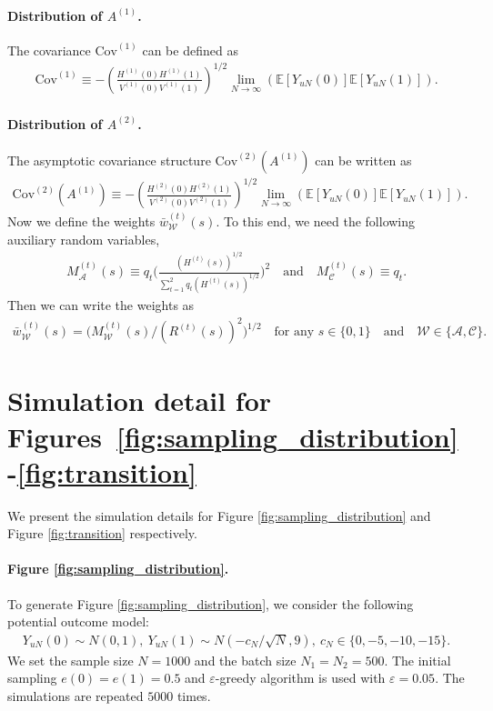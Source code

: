 \documentclass[12pt]{article}
\newcommand{\E}{\mathbb E}								%
\begin{document}
\paragraph{Distribution of $A^{(1)}$.}

The covariance $\mathrm{Cov}^{(1)}$ can be defined as
\begin{align}\label{eq:covariance_A_1}
	\mathrm{Cov}^{(1)}\equiv - \left(\frac{H^{(1)}(0)H^{(1)}(1)}{V^{(1)}(0)V^{(1)}(1)}\right)^{1/2}\lim_{N\rightarrow\infty}\left(\E[Y_{uN}(0)]
	\E[Y_{uN}(1)]\right).
\end{align}


\paragraph{Distribution of $A^{(2)}$.}


The asymptotic covariance structure $\mathrm{Cov}^{(2)}(A^{(1)})$ can be written as
\begin{align}\label{eq:covariance_A_2}
	\mathrm{Cov}^{(2)}(A^{(1)})\equiv - \left(\frac{H^{(2)}(0)H^{(2)}(1)}{V^{(2)}(0)V^{(2)}(1)}\right)^{1/2}\lim_{N\rightarrow\infty}\left(\E[Y_{uN}(0)]
	\E[Y_{uN}(1)]\right).
\end{align}
Now we define the weights $\bar w_{\mathcal{W}}^{(t)}(s)$. To this end, we need the following auxiliary random variables,
\begin{align*}
	M_{\mathcal{A}}^{(t)}(s)\equiv q_t\Big(\frac{(H^{(t)}(s))^{1/2}}{\sum_{t=1}^2 q_t (H^{(t)}(s))^{1/2}}\Big)^2\quad\text{and}\quad M_{\mathcal{C}}^{(t)}(s)\equiv q_t.
\end{align*}
Then we can write the weights as 
\begin{align*}
	\bar w_{\mathcal{W}}^{(t)}(s)=\big(M_{\mathcal{W}}^{(t)}(s)/(R^{(t)}(s))^2\big)^{1/2}\quad\text{for any }s\in\{0,1\}\quad\text{and}\quad \mathcal{W}\in\{\mathcal{A},\mathcal{C}\}.
\end{align*}



\section{Simulation detail for Figures~\ref{fig:sampling_distribution}-\ref{fig:transition}}\label{sec:illustration_simulation}

We present the simulation details for Figure \ref{fig:sampling_distribution} and Figure \ref{fig:transition} respectively. 

\paragraph{Figure \ref{fig:sampling_distribution}.}
To generate Figure \ref{fig:sampling_distribution}, we consider the following potential outcome model: 
\begin{align}\label{eq:simulation-model}
	Y_{uN}(0)\sim N(0,1),\ Y_{uN}(1)\sim N(-c_N/\sqrt{N},9),\ c_N\in\{0,-5,-10,-15\}.
\end{align}
We set the sample size $N=1000$ and the batch size $N_1=N_2=500$. 
The initial sampling $e(0)=e(1)=0.5$ and $\varepsilon$-greedy algorithm is used with $\varepsilon=0.05$. The simulations are repeated $5000$ times.
\end{document}
